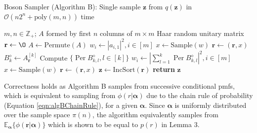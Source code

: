 \documentclass[ %
                    author={Manan Vaswani},
                supervisor={Dr. Raphael Clifford},
                    degree={MEng},
                     title={A multi-core CPU implementation of the classical Boson Sampling algorithm},
                  subtitle={},
                      type={},
                      year={2019} ]{dissertation}
\theoremstyle{plain}
\theoremstyle{definition}
\DeclareMathOperator*{\Per}{\mathrm{Per}}
\begin{document}
\begin{algorithm}
\caption{Boson Sampler (Algorithm B): Single sample $\mathbf{z}$ from $q(\mathbf{z})$ in $\mathcal{O}(n2^n + \text{poly}(m, n))$ time}
\begin{algorithmic}[1]
\Require $m, n \in \mathbb{Z}_+$; $A$ formed by first $n$ columns of $m \times m$ Haar random unitary matrix
\State $\mathbf{r} \leftarrow \O $	
\State $A \leftarrow \text{Permute}(A)$	
\State $w_i \leftarrow \left|a_{i, 1}\right|^2, i \in [m]$	
\State $x \leftarrow \text{Sample}(w)$	
\State $\mathbf{r} \leftarrow (\mathbf{r}, x)$	
\State $B_k^\diamond \leftarrow A_{\mathbf{r}}^{[k]}$
\State Compute  $\{ \Per B_{k, l}^{\diamond}, l \in [k] \}$	
\State $w_i \leftarrow \left| \sum_{l = 1}^k \Per B_{k, l}^{\diamond} \right| ^2, i \in [m] $	
\State $x \leftarrow \text{Sample}(w)$
\State $\mathbf{r} \leftarrow (\mathbf{r}, x)$
\EndFor
\State $\mathbf{z} \leftarrow \text{IncSort}(\mathbf{r})$	
\State \textbf{return} $\mathbf{z}$
\end{algorithmic}
\end{algorithm}

Correctness holds as Algorithm B samples from successive conditional pmfs, which is equivalent to sampling from $\phi (r | \mathbf{\alpha})$ due to the chain rule of probability (Equation \ref{eqn:algBChainRule}), for a given $\mathbf{\alpha}$. Since  $\mathbf{\alpha}$ is uniformly distributed over the sample space $\pi(n)$, the algorithm equivalently samples from $\mathbb{E}_{\mathbf{\alpha}}\{\phi(\mathbf{r} | \mathbf{\alpha})\}$ which is shown to be equal to $p(r)$ in Lemma 3.
\end{document}
